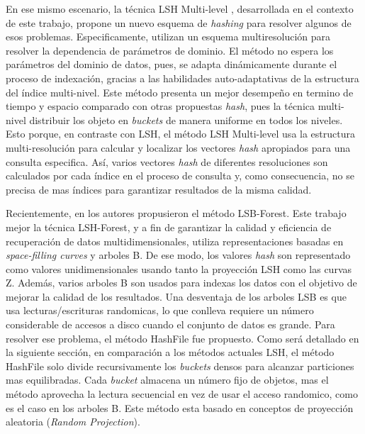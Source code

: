 En ese mismo escenario,  la técnica LSH Multi-level \cite{DBLP:journals/jidm/OcsaS10}, desarrollada en el contexto de este trabajo, propone un nuevo esquema de \textit{hashing} para resolver algunos de esos problemas. Especificamente, utilizan un esquema multiresolución para resolver la dependencia de parámetros de dominio. El método no espera los parámetros del dominio de datos, pues, se adapta dinámicamente durante el proceso de indexación, gracias a las habilidades auto-adaptativas de la estructura del índice multi-nivel. Este método presenta un mejor desempeño en termino de tiempo y espacio comparado con otras propuestas \textit{hash}, pues la técnica multi-nivel distribuir los objeto en \textit{buckets} de manera uniforme en todos los niveles. Esto porque, en contraste con LSH, el método LSH Multi-level usa la estructura multi-resolución para calcular y localizar los vectores \textit{hash} apropiados para una consulta especifica. Así, varios vectores \textit{hash} de diferentes resoluciones son calculados por cada índice en el proceso de consulta y, como consecuencia, no se precisa de mas índices para garantizar resultados de la misma calidad.

Recientemente, en \cite{taoLSBLSH}  los autores propusieron el método LSB-Forest. Este trabajo mejor la técnica LSH-Forest, y a fin de garantizar la calidad y eficiencia de recuperación de datos multidimensionales, utiliza representaciones basadas en \textit{space-filling curves} y arboles B. De ese modo, los valores \textit{hash} son representado como valores unidimensionales usando tanto la proyección LSH como las curvas Z. Además, varios arboles B son usados para indexas los datos con el objetivo de mejorar la calidad de los resultados. Una desventaja de los arboles LSB es que usa lecturas/escrituras randomicas, lo que conlleva requiere un número considerable de accesos a disco cuando el conjunto de datos es grande. Para resolver ese problema, el método HashFile \cite{lshHashFile}  fue propuesto. Como será detallado en la siguiente sección, en comparación a los métodos actuales LSH, el método HashFile solo divide recursivamente los \textit{buckets} densos para alcanzar particiones mas equilibradas. Cada \textit{bucket} almacena un número fijo de objetos, mas el método aprovecha la lectura secuencial en vez de usar el acceso randomico, como es el caso en los arboles  B. Este método esta basado en conceptos de proyección aleatoria (\textit{Random Projection}).
 
 
 


